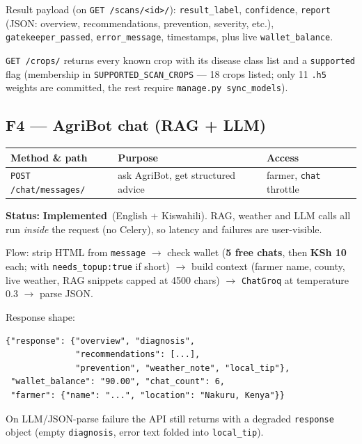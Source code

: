 \documentclass[11pt,a4paper]{article}
\newcommand{\done}{\textcolor{statusdone}{\textbf{Implemented}}}
\newcommand{\code}[1]{\texttt{\allowbreak #1\allowbreak}}
\begin{document}
Result payload (on \code{GET /scans/<id>/}): \code{result\_label},
\code{confidence}, \code{report} (JSON: overview, recommendations,
prevention, severity, etc.), \code{gatekeeper\_passed},
\code{error\_message}, timestamps, plus live \code{wallet\_balance}.

\code{GET /crops/} returns every known crop with its disease class list and
a \code{supported} flag (membership in \code{SUPPORTED\_SCAN\_CROPS} --- 18
crops listed; only 11 \code{.h5} weights are committed, the rest require
\code{manage.py sync\_models}).

\subsection{F4 --- AgriBot chat (RAG + LLM)}
\begin{center}
\small
\begin{tabularx}{\textwidth}{@{} l X l @{}}
\toprule
\textbf{Method \& path} & \textbf{Purpose} & \textbf{Access} \\
\midrule
\code{POST /chat/messages/} & ask AgriBot, get structured advice & farmer, \code{chat} throttle \\
\bottomrule
\end{tabularx}
\end{center}

\textbf{Status:} \done\ (English + Kiswahili). RAG, weather and LLM calls
all run \emph{inside} the request (no Celery), so latency and failures are
user-visible.

Flow: strip HTML from \code{message} $\rightarrow$ check wallet
(\textbf{5 free chats}, then \textbf{KSh 10} each; \code{402} with
\code{needs\_topup:true} if short) $\rightarrow$ build context (farmer name,
county, live weather, RAG snippets capped at 4500 chars) $\rightarrow$
\code{ChatGroq} at temperature 0.3 $\rightarrow$ parse JSON.

Response shape:
\begin{verbatim}
{"response": {"overview", "diagnosis",
              "recommendations": [...],
              "prevention", "weather_note", "local_tip"},
 "wallet_balance": "90.00", "chat_count": 6,
 "farmer": {"name": "...", "location": "Nakuru, Kenya"}}
\end{verbatim}
On LLM/JSON-parse failure the API still returns \code{200} with a degraded
\code{response} object (empty \code{diagnosis}, error text folded into
\code{local\_tip}).
\end{document}
